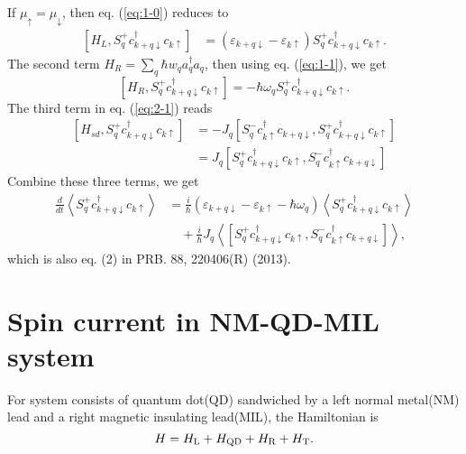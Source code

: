 \documentclass[11pt,a4paper]{book}
\begin{document}
If $\mu_{\uparrow} = \mu_{\downarrow}$, then eq. (\ref{eq:1-0}) reduces to
\begin{equation}
\begin{split}
\left[H_{L}, S_{q}^{+} c_{k+q \downarrow}^{\dagger} c_{k \uparrow}\right] &= \left(\varepsilon_{k+q \downarrow}-\varepsilon_{k \uparrow}\right)S_{q}^{+} c_{k+q \downarrow}^{\dagger} c_{k \uparrow}.
\end{split}
\label{eq:1-01}
\end{equation}
The second term $H_{R} = \sum_{q} \hbar w_{q} a_{q}^{\dagger} a_{q}$, then using eq. (\ref{eq:1-1}), we get
\begin{equation}
\left[H_{R}, S_{q}^{+} c_{k+q \downarrow}^{\dagger} c_{k \uparrow}\right] = -\hbar \omega_{q}S_{q}^{+} c_{k+q \downarrow}^{\dagger} c_{k \uparrow}.
\end{equation}
The third term in eq. (\ref{eq:2-1}) reads
\begin{equation}
\begin{split}
\left[H_{sd}, S_{q}^{+} c_{k+q \downarrow}^{\dagger} c_{k \uparrow}\right] &= - J_{q} \left[S_{q}^{-} c_{k \uparrow}^{\dagger} c_{k+q \downarrow}, S_{q}^{+} c_{k+q \downarrow}^{\dagger} c_{k \uparrow}\right] \\
&= J_{q} \left[S_{q}^{+} c_{k+q \downarrow}^{\dagger} c_{k \uparrow}, S_{q}^{-} c_{k \uparrow}^{\dagger} c_{k+q \downarrow}\right]
\end{split}
\end{equation}
Combine these three terms, we get
\begin{equation}
\begin{split}
\frac{d}{d t}\left\langle S_{q}^{+} c_{k+q \downarrow}^{\dagger} c_{k \uparrow}\right\rangle&=\frac{i}{\hbar}\left(\varepsilon_{k+q \downarrow}-\varepsilon_{k \uparrow}-\hbar \omega_{q}\right)\left\langle S_{q}^{+} c_{k+q \downarrow}^{\dagger} c_{k \uparrow}\right\rangle\\ 
&\quad + \frac{i}{\hbar} J_{q}\left\langle\left[S_{q}^{+} c_{k+q \downarrow}^{\dagger} c_{k \uparrow}, S_{q}^{-} c_{k \uparrow}^{\dagger} c_{k+q \downarrow}\right]\right\rangle,
\end{split}
\end{equation}
which is also eq. (2) in PRB. 88, 220406(R) (2013).

\section{Spin current in NM-QD-MIL system}
For system consists of quantum dot(QD) sandwiched by a left normal metal(NM) lead and a right magnetic insulating lead(MIL), the Hamiltonian is
\begin{equation}
H=H_{\rm{L}}+H_{\rm{QD}}+H_{\rm{R}}+H_{\rm{T}}.
\end{equation}
\end{document}
